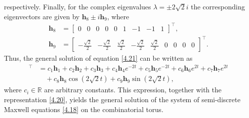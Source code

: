 \documentclass[english]{article}
\theoremstyle{plain}
\theoremstyle{definition}
\theoremstyle{remark}
\numberwithin{equation}{section}
\begin{document}
 respectively. Finally, for the complex eigenvalues $\lambda = \pm 2\sqrt{2}i$ the corresponding eigenvectors are given by $\mathbf{h}_8\pm i\mathbf{h}_9$, where
\begin{align*}
 \mathbf{h}_8& = \begin{bmatrix} 0 & 0 & 0 & 0 & 0 & 1 & -1 & -1 & 1 \end{bmatrix}^\top, \\
 \mathbf{h}_9& = \begin{bmatrix} -\frac{\sqrt{2}}{2} & -\frac{\sqrt{2}}{2} & \frac{\sqrt{2}}{2} & -\frac{\sqrt{2}}{2} & \frac{\sqrt{2}}{2} & 0 & 0 & 0 & 0 \end{bmatrix}^\top.
\end{align*}
Thus, the general solution of  equation \eqref{4.21} can be written  as
\begin{align*}
[\tilde{E}H]^\top &= c_1 \mathbf{h}_1 + c_2 \mathbf{h}_2 + c_3 \mathbf{h}_3
+ c_4 \mathbf{h}_4 e^{-2t} + c_5 \mathbf{h}_5 e^{-2t}
+ c_6 \mathbf{h}_6 e^{2t} + c_7 \mathbf{h}_7 e^{2t} \\
&\quad + c_8 \mathbf{h}_8 \cos(2\sqrt{2}t) + c_9 \mathbf{h}_9 \sin(2\sqrt{2}t),
\end{align*}
 where $c_i\in \mathbb{R}$ are arbitrary constants.
 This expression, together with the representation \eqref{4.20}, yields the general solution of the system of semi-discrete Maxwell equations \eqref{4.18} on the combinatorial torus.



 
\end{document}
